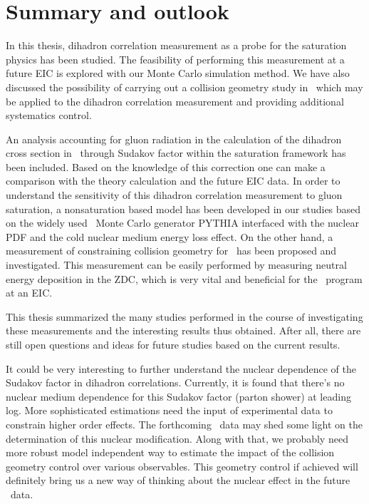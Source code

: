 \chapter{Summary and outlook} \label{chp:summary}

In this thesis, dihadron correlation measurement as a probe for the saturation
physics has been studied. The feasibility of performing this measurement at a
future EIC is explored with our Monte Carlo simulation method. We have also
discussed the possibility of carrying out a collision geometry study in \eA\,
which may be applied to the dihadron correlation measurement and providing
additional systematics control.

An analysis accounting for gluon radiation in the calculation of the dihadron
cross section in \eA\ through Sudakov factor within the saturation framework has
been included. Based on the knowledge of this correction one can make a
comparison with the theory calculation and the future EIC data. In order to
understand the sensitivity of this dihadron correlation measurement to gluon
saturation, a nonsaturation based model has been developed in our studies based
on the widely used \ep\ Monte Carlo generator PYTHIA interfaced with the nuclear
PDF and the cold nuclear medium energy loss effect. On the other hand, a
measurement of constraining collision geometry for \eA\ has been proposed and
investigated. This measurement can be easily performed by measuring neutral
energy deposition in the ZDC, which is very vital and beneficial for the \eA\ program at an EIC. 

This thesis summarized the many studies performed in the course of investigating
these measurements and the interesting results thus obtained. After all, there
are still open questions and ideas for future studies based on the current
results.

It could be very interesting to further understand the nuclear dependence of the
Sudakov factor in dihadron correlations. Currently, it is found that there's no
nuclear medium dependence for this Sudakov factor (parton shower) at leading
log. More sophisticated estimations need the input of experimental data to
constrain higher order effects. The forthcoming \pA\ data may shed some light on
the determination of this nuclear modification. Along with that, we probably
need more robust model independent way to estimate the impact of the collision
geometry control over various observables. This geometry control if achieved
will definitely bring us a new way of thinking about the nuclear effect in the
future \eA\ data.
